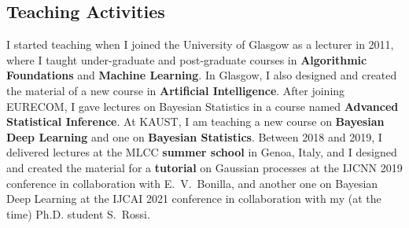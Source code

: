 \documentclass[oneside, a4paper, onecolumn, 10pt]{article}
\begin{document}



\subsection*{Teaching Activities}

I started teaching when I joined the University of Glasgow as a lecturer in 2011, where I taught under-graduate and post-graduate courses in {\bf Algorithmic Foundations} and {\bf Machine Learning}.
In Glasgow, I also designed and created the material of a new course in {\bf Artificial Intelligence}. 
After joining EURECOM, I gave lectures on Bayesian Statistics in a course named {\bf Advanced Statistical Inference}.
At KAUST, I am teaching a new course on {\bf Bayesian Deep Learning} and one on {\bf Bayesian Statistics}.
Between 2018 and 2019, I delivered lectures at the MLCC {\bf summer school} in Genoa, Italy, and I designed and created the material for a {\bf tutorial} on Gaussian processes at the IJCNN 2019 conference in collaboration with E.~V.~Bonilla, and another one on Bayesian Deep Learning at the IJCAI 2021 conference in collaboration with my (at the time) Ph.D. student S.~Rossi. 

\end{document}
